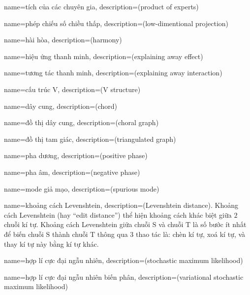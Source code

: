 {
    name={tích của các chuyên gia},
    description={(product of experts)}
}

{
    name={phép chiếu số chiều thấp},
    description={(low-dimentional projection)}
}

{
    name={hài hòa},
    description={(harmony)}
}

{
    name={hiệu ứng thanh minh},
    description={(explaining away effect)}
}

{
    name={tương tác thanh minh},
    description={(explaining away interaction)}
}

{
    name={cấu trúc V},
    description={(V structure)}
}

{
    name={dây cung},
    description={(chord)}
}

{
    name={đồ thị dây cung},
    description={(choral graph)}
}

{
    name={đồ thị tam giác},
    description={(triangulated graph)}
}

{
    name={pha dương},
    description={(positive phase)}
}

{
    name={pha âm},
    description={(negative phase)}
}

{
    name={mode giả mạo},
    description={(spurious mode)}
}

{
    name={khoảng cách Levenshtein},
    description={(Levenshtein distance). Khoảng cách Levenshtein (hay ``edit distance'') thể hiện khoảng
    cách khác biệt giữa $2$ chuỗi kí tự. Khoảng cách Levenshtein giữa chuỗi $\mathrm{S}$ và
    chuỗi $\mathrm{T}$ là số bước ít nhất để biến chuỗi $\mathrm{S}$ thành chuỗi $\mathrm{T}$
    thông qua $3$ thao tác là: chèn kí tự, xoá kí tự, và thay kí tự này bằng kí tự khác.}
}

{
    name={hợp lí cực đại ngẫu nhiên},
    description={(stochastic maximum likelihood)}
}


{
    name={hợp lí cực đại ngẫu nhiên biến phân},
    description={(variational stochastic maximum likelihood)}
}

